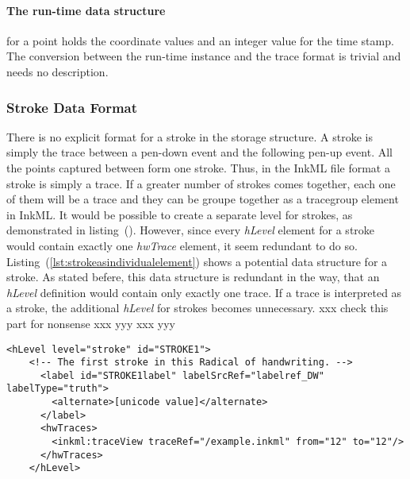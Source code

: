 \paragraph{The run-time data structure} for a point holds the coordinate values 
and an integer value for the time stamp. The conversion between the run-time 
instance and the trace format is trivial and needs no description.

\subsubsection{Stroke Data Format}
\label{sec:hwre:strokedataformat}

There is no explicit format for a stroke in the storage structure.
A stroke is simply the trace between a pen-down event and the following pen-up
event. All the points captured between form one stroke.
Thus, in the InkML file format a stroke is simply a trace.
If a greater number of strokes comes together, each one of them will be a trace
and they can be groupe together as a tracegroup element in InkML.
It would be possible to create a separate level for strokes, as demonstrated
in listing~(). However, since every \emph{hLevel} element for a stroke would 
contain exactly one \emph{hwTrace} element, it seem redundant to do so.
Listing~(\ref{lst:strokeasindividualelement}) shows a potential data structure
for a stroke. As stated befere, this data structure is redundant in the way, 
that an \emph{hLevel} definition would contain only exactly one trace.
If a trace is interpreted as a stroke, the additional \emph{hLevel} for strokes
becomes unnecessary.
xxx check this part for nonsense xxx yyy xxx yyy
\begin{xmlcode}
  \begin{lstlisting}[emph={hLevel,hwTraces,label,alternative},
                     emphstyle=\color{blue}\textbf,
                     emph={[2]level,labelSrcRef,labelType,traceRef,from,to},
                     emphstyle={[2]\color{red}},
                     caption={A sample of how a stroke could be represented},
                     label=lst:strokeasindividualelement]
    <hLevel level="stroke" id="STROKE1">
    <!-- The first stroke in this Radical of handwriting. -->
      <label id="STROKE1label" labelSrcRef="labelref_DW" labelType="truth">
        <alternate>[unicode value]</alternate>
      </label>
      <hwTraces>
        <inkml:traceView traceRef="/example.inkml" from="12" to="12"/>
      </hwTraces>
    </hLevel>
  \end{lstlisting}
\end{xmlcode}

